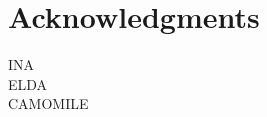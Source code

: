 \documentclass{acm_proc_article-me}
\begin{document}
\section{Acknowledgments}

INA \\
ELDA \\
CAMOMILE \\


\newpage


\end{document}
